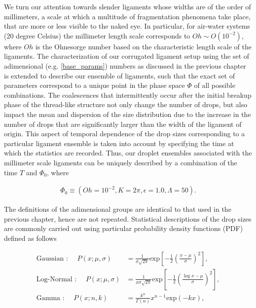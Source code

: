 We turn our attention towards slender ligaments whose widths are of the 
order of millimeters, a scale at which a multitude of fragmentation phenomena
take place, that are more or less visible to the naked eye.
In particular, for air-water systems (20 degree Celsius) the millimeter length 
scale corresponds to $Oh \sim O(10^{-2})$, where $Oh$ is the Ohnesorge number
based on the characteristic length scale of the ligaments. 
The characterization of our corrugated ligament setup using the set of adimensional
(e.g. \eqref{base_params}) numbers as discussed in the previous chapter is extended 
to describe our ensemble of ligaments, such that the exact set of parameters
correspond to a unique point in the phase space $\Phi$ of all possible combinations. 
The coalescences that intermittently occur after the initial breakup phase of 
the thread-like structure not only change the number of drops, but also impact the 
mean and dispersion of the size distribution due to the increase in the number of drops that 
are significantly larger than the width of the ligament of origin.   
This aspect of temporal dependence of the drop sizes corresponding to a particular ligament ensemble
is taken into account by specifying the time at which the statistics are recorded. 
Thus, our droplet ensembles associated with the millimeter scale ligaments can be uniquely described 
by a combination of the time $T$ and $\Phi_0$, where

\begin{align}
	\Phi_0 \equiv \left( Oh=10^{-2}, K=2\pi, \epsilon=1.0, \Lambda=50 \right). 
\end{align}

The definitions of the adimensional groups are identical to that used
in the previous chapter, hence are not repeated.
Statistical descriptions of the drop sizes are commonly carried out using
particular probability density functions (PDF) defined as follows 



\begin{align}
	\text{Gaussian : } \quad P\left( x ; \mu , \sigma \right) &= 
	\frac{1}{\sigma \sqrt{2\pi}} \textrm{exp}\left[-\frac{1}{2}\left(\frac{x - \mu}{\sigma}\right)^2\right] \label{gauss},\\
	\text{Log-Normal : } \quad P\left( x ; \mu , \sigma \right) &= 
	\frac{1}{x \sigma \sqrt{2\pi}} \textrm{exp}\left[-\frac{1}{2}\left(\frac{\log x - \mu}{\sigma}\right)^2\right] \label{log_normal},\\
	\text{Gamma : } \quad P\left( x ; n,k \right) &= 
	\frac{k^{n}}{\Gamma(n)} x^{n-1} \textrm{exp}\left(-k x\right) \label{gamma}, 
\end{align}

